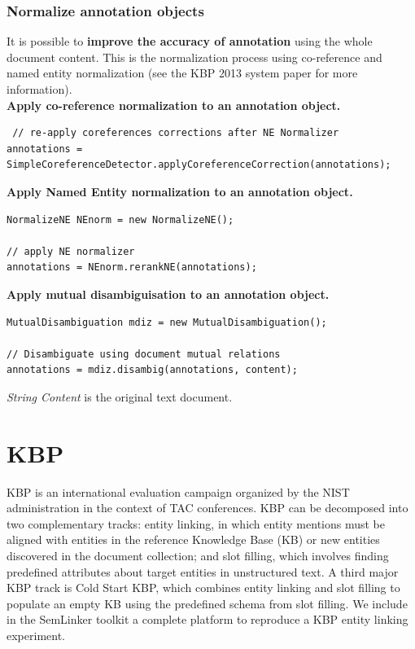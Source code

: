 \documentclass[11pt]{article}
\newcommand{\seml}{SemLinker}
\begin{document}
\subsubsection{Normalize annotation objects}
It is possible to \textbf{improve the accuracy of annotation} using the whole document content. 
This is the normalization process using co-reference and named entity normalization (see the KBP 2013 system paper for more information). \\

\textbf{Apply co-reference normalization to an annotation object.}
\begin{lstlisting}
 // re-apply coreferences corrections after NE Normalizer
annotations = SimpleCoreferenceDetector.applyCoreferenceCorrection(annotations);
\end{lstlisting}

\textbf{Apply Named Entity normalization to an annotation object.}
\begin{lstlisting}
NormalizeNE NEnorm = new NormalizeNE();

// apply NE normalizer
annotations = NEnorm.rerankNE(annotations);
\end{lstlisting}

\textbf{Apply mutual disambiguisation to an annotation object.}
\begin{lstlisting}
MutualDisambiguation mdiz = new MutualDisambiguation();

// Disambiguate using document mutual relations
annotations = mdiz.disambig(annotations, content);
\end{lstlisting}

\textit{String Content} is the original text document.


\section{KBP}
\label{sec:kbpcamp}
KBP is an international evaluation campaign organized by the NIST administration in the context of TAC conferences. 
KBP can be decomposed into two complementary tracks: 
entity linking, in which entity mentions must be aligned with entities in the reference Knowledge Base (KB) or new entities discovered in the document collection; 
and slot filling, which involves finding predefined attributes about target entities in unstructured text. 
A third major KBP track is Cold Start KBP, which combines entity linking and slot filling to populate an empty KB using the predefined schema from slot filling. 
We include in the \seml{} toolkit a complete platform to reproduce a KBP entity linking experiment. 
\end{document}

